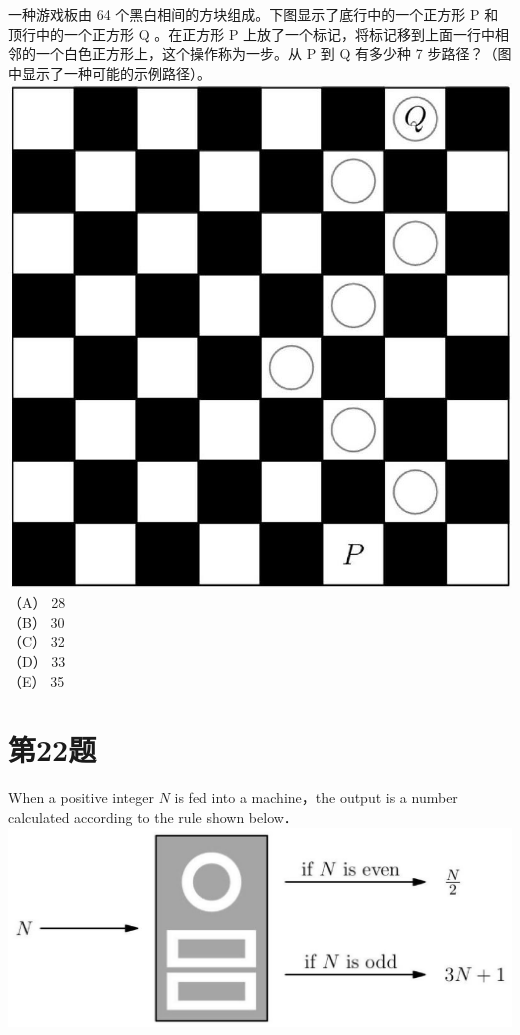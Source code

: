\documentclass[10pt]{article}
\begin{document}
一种游戏板由 64 个黑白相间的方块组成。下图显示了底行中的一个正方形 P 和顶行中的一个正方形 Q 。在正方形 P 上放了一个标记，将标记移到上面一行中相邻的一个白色正方形上，这个操作称为一步。从 P 到 Q 有多少种 7 步路径？（图中显示了一种可能的示例路径）。\\
\includegraphics[max width=\textwidth, center]{2025_09_05_48544237b06df716137eg-12}\\
（A） 28\\
（B） 30\\
（C） 32\\
（D） 33\\
（E） 35

\section*{第22题}
When a positive integer $N$ is fed into a machine，the output is a number calculated according to the rule shown below．\\
\includegraphics[max width=\textwidth, center]{2025_09_05_48544237b06df716137eg-13}
\end{document}
